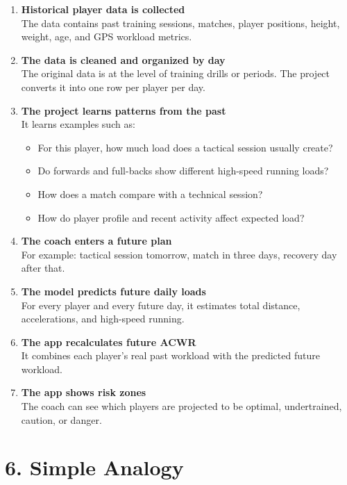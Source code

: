 \documentclass[11pt,a4paper]{article}
\begin{document}
\begin{enumerate}
  \item \textbf{Historical player data is collected}\\
  The data contains past training sessions, matches, player positions, height, weight, age, and GPS workload metrics.

  \item \textbf{The data is cleaned and organized by day}\\
  The original data is at the level of training drills or periods. The project converts it into one row per player per day.

  \item \textbf{The project learns patterns from the past}\\
  It learns examples such as:
  \begin{itemize}
    \item For this player, how much load does a tactical session usually create?
    \item Do forwards and full-backs show different high-speed running loads?
    \item How does a match compare with a technical session?
    \item How do player profile and recent activity affect expected load?
  \end{itemize}

  \item \textbf{The coach enters a future plan}\\
  For example: tactical session tomorrow, match in three days, recovery day after that.

  \item \textbf{The model predicts future daily loads}\\
  For every player and every future day, it estimates total distance, accelerations, and high-speed running.

  \item \textbf{The app recalculates future ACWR}\\
  It combines each player's real past workload with the predicted future workload.

  \item \textbf{The app shows risk zones}\\
  The coach can see which players are projected to be optimal, undertrained, caution, or danger.
\end{enumerate}

\section*{6. Simple Analogy}
\end{document}
